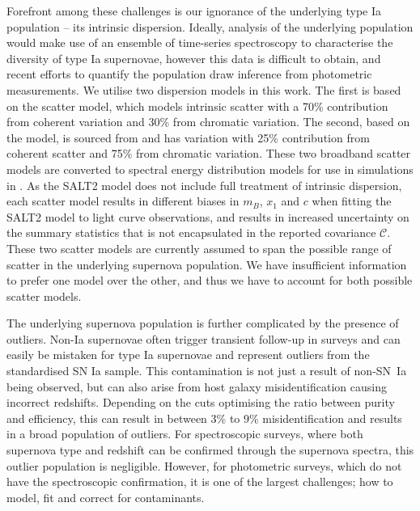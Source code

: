 \documentclass[a4paper,fleqn,usenatbib]{mnras}
\newcommand{\green}{\color{forestgreen}}
\newcommand{\gten}{\citetalias{Guy2010}}
\newcommand{\celeven}{\citetalias{Chotard2011}}
\begin{document}
{\green Forefront among these challenges is our ignorance of the underlying type Ia population -- its intrinsic dispersion}. Ideally, analysis of the underlying population would make use of an ensemble of time-series spectroscopy to characterise the diversity of type Ia supernovae, however this data is difficult to obtain, and recent efforts to quantify the population draw inference from photometric measurements. We utilise two dispersion models in this work. The {\green first is based on the} \citet[][hereafter denoted {\gten}]{Guy2010} scatter model, which models intrinsic scatter with a 70\% contribution from coherent variation and 30\% from chromatic variation. The second, {\green based on the} {\celeven} model, is sourced from \citet{Chotard2011} and has variation with 25\% contribution from coherent scatter and 75\% from chromatic variation. {\green These two broadband scatter models are converted to spectral energy distribution models for use in simulations in \citet{Kessler13}.} As the SALT2 model does not include full treatment of intrinsic dispersion, each scatter model results in different biases in $m_B$, $x_1$ and $c$ when fitting the SALT2 model to light curve observations, and results in increased uncertainty on the summary statistics that is not encapsulated in the reported covariance $\mathcal{C}$. These two scatter models are currently {\green assumed} to span the possible range of scatter in the underlying supernova population. We have insufficient information to prefer one model over the other, and thus we have to account for both possible scatter models.

The underlying supernova population is further complicated by the presence of outliers. Non-Ia supernovae often trigger transient follow-up in surveys and can easily be mistaken for type Ia supernovae {\green and represent outliers from the standardised SN Ia sample.} This contamination is not just a result of non-SN~Ia being observed, but can also arise from host galaxy misidentification causing incorrect redshifts. Depending on the cuts {\green optimising the} ratio between purity and efficiency, this can result in between 3\% to 9\% misidentification \citep{Gupta2016} and results in a broad population of outliers. For spectroscopic surveys, where both supernova type and redshift can be confirmed through the supernova spectra, this outlier population is negligible. However, for photometric surveys, which do not have the spectroscopic confirmation, it is one of the largest challenges; how to model, fit and correct for contaminants.
\end{document}
